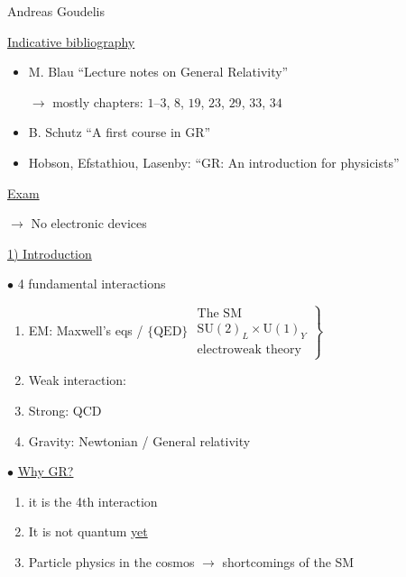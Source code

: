 \documentclass[a4paper,12pt]{article}
\begin{document}
\pagestyle{empty}

\begin{center}
{\Large Andreas Goudelis}

\vspace{1.0em}
\uline{Indicative bibliography}
\end{center}

\begin{itemize}
  \item M. Blau \quad ``Lecture notes on General Relativity''
  \begin{flushleft}
  $\longrightarrow$ mostly chapters: \quad $1$--$3$, $8$, $19$, $23$, $29$, $33$, $34$
  \end{flushleft}
  \item B. Schutz \quad ``A first course in GR''
  \item Hobson, Efstathiou, Lasenby: \quad ``GR: An introduction for physicists''
\end{itemize}

\uline{Exam}

$\longrightarrow$ No electronic devices


\vspace{0.3em}
\uline{1) Introduction}

$\bullet$ 4 fundamental interactions

\begin{enumerate}[label=\roman*)]
  \item EM: Maxwell's eqs / $\{\mathrm{QED}\}$
  \hfill $\left.\begin{gathered}\text{The SM}\\[0.1em]\mathrm{SU}(2)_L\times\mathrm{U}(1)_Y\\\text{electroweak theory}\end{gathered}\right\}$
  \item Weak interaction:
  \item Strong: QCD
  \item Gravity: Newtonian / General relativity
\end{enumerate}

$\bullet$ \uline{Why GR?}
\begin{enumerate}[label=\roman*)]
  \item it is the 4th interaction
  \item It is not quantum \uline{yet}
  \item Particle physics in the cosmos $\longrightarrow$ shortcomings of the SM
\end{enumerate}
\end{document}
